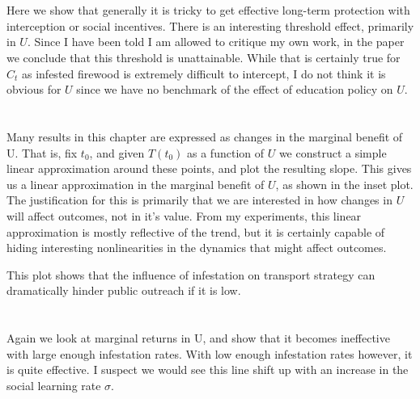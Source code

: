 \documentclass{article}
\begin{document}
\section{}

Here we show that generally it is tricky to get effective long-term protection with interception or social incentives. There is an interesting threshold effect, primarily in $U$. Since I have been told I am allowed to critique my own work, in the paper we conclude that this threshold is unattainable. While that is certainly true for $C_t$ as infested firewood is extremely difficult to intercept, I do not think it is obvious for $U$ since we have no benchmark of the effect of education policy on $U$.



\section{}

Many results in this chapter are expressed as changes in the marginal benefit of U. That is, fix $t_0$, and given $T(t_0)$ as a function of $U$ we construct a simple linear approximation around these points, and plot the resulting slope. This gives us a linear approximation in the marginal benefit of $U$, as shown in the inset plot. The justification for this is primarily that we are interested in how changes in $U$ will affect outcomes, not in it's value. From my experiments, this linear approximation is mostly reflective of the trend, but it is certainly capable of hiding interesting nonlinearities in the dynamics that might affect outcomes.  

This plot shows that the influence of infestation on transport strategy can dramatically hinder public outreach if it is low. 

\section{}

Again we look at marginal returns in U, and show that it becomes ineffective with large enough infestation rates. With low enough infestation rates however, it is quite effective. I suspect we would see this line shift up with an increase in the social learning rate $\sigma$.

\section{}
\end{document}
